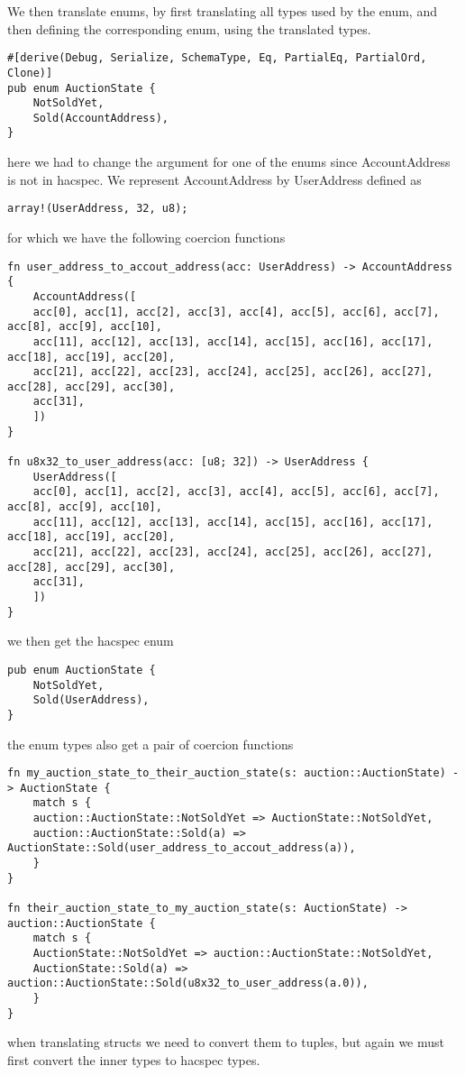 \documentclass[11pt]{article}
\begin{document}
We then translate enums, by first translating all types used by the enum, and then 
defining the corresponding enum, using the translated types.
\begin{verbatim}
#[derive(Debug, Serialize, SchemaType, Eq, PartialEq, PartialOrd, Clone)]
pub enum AuctionState {
    NotSoldYet,
    Sold(AccountAddress),
}
\end{verbatim}
here we had to change the argument for one of the enums since AccountAddress is not in hacspec. 
We represent AccountAddress by UserAddress defined as
\begin{verbatim}
array!(UserAddress, 32, u8);
\end{verbatim}
for which we have the following coercion functions
\begin{verbatim}
fn user_address_to_accout_address(acc: UserAddress) -> AccountAddress {
    AccountAddress([
	acc[0], acc[1], acc[2], acc[3], acc[4], acc[5], acc[6], acc[7], acc[8], acc[9], acc[10],
	acc[11], acc[12], acc[13], acc[14], acc[15], acc[16], acc[17], acc[18], acc[19], acc[20],
	acc[21], acc[22], acc[23], acc[24], acc[25], acc[26], acc[27], acc[28], acc[29], acc[30],
	acc[31],
    ])
}

fn u8x32_to_user_address(acc: [u8; 32]) -> UserAddress {
    UserAddress([
	acc[0], acc[1], acc[2], acc[3], acc[4], acc[5], acc[6], acc[7], acc[8], acc[9], acc[10],
	acc[11], acc[12], acc[13], acc[14], acc[15], acc[16], acc[17], acc[18], acc[19], acc[20],
	acc[21], acc[22], acc[23], acc[24], acc[25], acc[26], acc[27], acc[28], acc[29], acc[30],
	acc[31],
    ])
}
\end{verbatim}
we then get the hacspec enum
\begin{verbatim}
pub enum AuctionState {
    NotSoldYet,
    Sold(UserAddress),
}
\end{verbatim}
the enum types also get a pair of coercion functions
\begin{verbatim}
fn my_auction_state_to_their_auction_state(s: auction::AuctionState) -> AuctionState {
    match s {
	auction::AuctionState::NotSoldYet => AuctionState::NotSoldYet,
	auction::AuctionState::Sold(a) => AuctionState::Sold(user_address_to_accout_address(a)),
    }
}

fn their_auction_state_to_my_auction_state(s: AuctionState) -> auction::AuctionState {
    match s {
	AuctionState::NotSoldYet => auction::AuctionState::NotSoldYet,
	AuctionState::Sold(a) => auction::AuctionState::Sold(u8x32_to_user_address(a.0)),
    }
}
\end{verbatim}
when translating structs we need to convert them to tuples, but again we must first convert the inner types to hacspec types.
\end{document}
